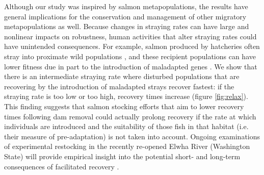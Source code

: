 \documentclass{revtex4}
\begin{document}


Although our study was inspired by salmon metapopulations, the results have general implications for the conservation and management of other migratory metapopulations as well. 
Because changes in straying rates can have large and nonlinear impacts on robustness, human activities that alter straying rates could have unintended consequences. 
For example, salmon produced by hatcheries often stray into proximate wild populations \citep{Brenner:2012gl}, and these recipient populations can have lower fitness due in part to the introduction of maladapted genes \citep{Ford:2002ip}. 
We show that there is an intermediate straying rate where disturbed populations that are recovering by the introduction of maladapted strays recover fastest: if the straying rate is too low or too high, recovery times increase (figure \ref{fig:relax}).
This finding suggests that salmon stocking efforts that aim to lower recovery times following dam removal could actually prolong recovery if the rate at which individuals are introduced and the suitability of those fish in that habitat (i.e. their measure of pre-adaptation) is not taken into account.
Ongoing examinations of experimental restocking in the recently re-opened Elwha River (Washington State) will provide empirical insight into the potential short- and long-term consequences of facilitated recovery \citep{Liermann:2017gj}. 
\end{document}
